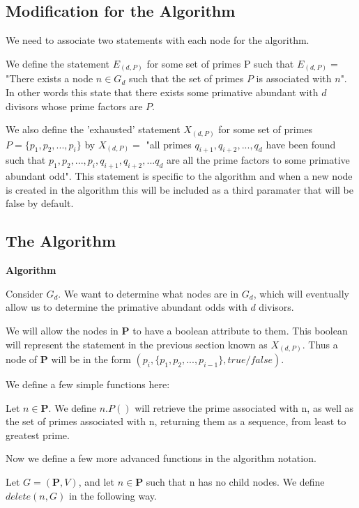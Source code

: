 \documentclass[../paper.tex]{subfiles}
\begin{document}
\subsection{Modification for the Algorithm}

We need to associate two statements with each node for the 
algorithm.

We define the statement $E_{(d,P)}$ for some set of primes P such 
that $E_{(d,P)} = $ "There exists a node $n \in G_d$ such that the set 
of primes $P$ is associated with $n$". In other words this state that 
there exists some primative abundant with $d$ divisors whose prime
factors are $P$.

We also define the 'exhausted' statement $X_{(d,P)}$ for some set of 
primes $P = \{p_1, p_2, ..., p_i\}$   by $X_{(d,P)} = $ "all primes 
$q_{i+1}, q_{i+2}, ..., q_d$ have been found such that $p_1,p_2, 
..., p_i, q_{i+1}, q_{i+2}, ...q_d$ are all the prime factors to some
primative abundant odd". This statement is specific to the algorithm 
and when a new node is created in the algorithm this will be included
as a third paramater that will be false by default. 


\subsection{The Algorithm}
\textbf{Algorithm} 

Consider $G_d$. We want to determine what nodes are in $G_d$, 
which will eventually allow us to determine the primative abundant 
odds with $d$ divisors.

We will allow the nodes in $\mathbf{P}$ to have a boolean 
attribute to them. This boolean will represent the statement in 
the previous section known as $X_{(d,P)}$. Thus a node of 
$\mathbf{P}$ will be in the form 
$(p_i, \{p_1, p_2, ..., p_{i-1}\}, true/false)$.

\noindent
We define a few simple functions here:

Let $n \in \mathbf{P}$.
%
We define $n.P()$ will retrieve the prime associated with n, as
well as the set of primes associated with n, returning them as a 
sequence, from least to greatest prime.

\noindent
Now we define a few more advanced functions in the algorithm 
notation.


Let $G = (\mathbf{P}, V)$, and
let $n \in \mathbf{P}$ such that n has no child nodes. 
%
We define $delete(n, G)$ in the following way.  
\end{document}
